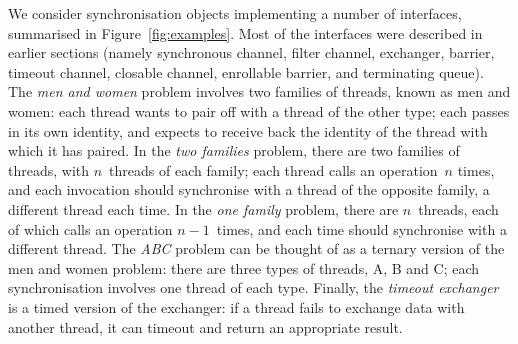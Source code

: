 We consider synchronisation objects implementing a number of interfaces,
summarised in Figure~\ref{fig:examples}.  Most of the interfaces were
described in earlier sections (namely synchronous channel, filter channel,
exchanger, barrier, timeout channel, closable channel, enrollable barrier, and
terminating queue).
%
The \emph{men and women} problem involves two families of threads, known as
men and women: each thread wants to pair off with a thread of the other type;
each passes in its own identity, and expects to receive back the identity of
the thread with which it has paired.  
%
In the \emph{two families} problem,
there are two families of threads, with $n$~threads of each family; each
thread calls an operation~$n$ times, and each invocation should synchronise
with a thread of the opposite family, a different thread each time.  In the
\emph{one family} problem, there are $n$~threads, each of which calls an
operation $n-1$~times, and each time should synchronise with a different
thread.  
%
The \emph{ABC} problem can be thought of as a ternary version of the men and
women problem: there are three types of threads, A, B and C; each
synchronisation involves one thread of each type.  
%
%
Finally, the \emph{timeout exchanger} is a timed version of the exchanger: if
a thread fails to exchange data with another thread, it can timeout and return
an appropriate result.



